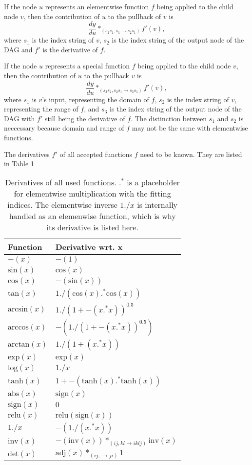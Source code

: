 \documentclass[12pt, a4paper]{report}
\begin{document}
If the node $u$ represents an elementwise function $f$ being applied to the child node $v$, then the contribution of $u$ to the pullback of $v$ is 
$$
\frac{dy}{du} *_{(s_2s_1,s_1 \rightarrow s_2s_1)} f'(v),
$$
where $s_1$ is the index string of $v$, $s_2$ is the index string of the output node of the DAG and $f'$ is the derivative of $f$.

If the node $u$ represents a special function $f$ being applied to the child node $v$, then the contribution of $u$ to the pullback $v$ is
$$
\frac{dy}{du} *_{(s_3s_2,s_2s_1 \rightarrow s_3s_1)} f'(v),
$$
where $s_1$ is $v$'s input, representing the domain of $f$, $s_2$ is the index string of $v$, representing the range of $f$, and $s_3$ is the index string of the output node of the DAG with $f'$ still being the derivative of $f$.
The distinction between $s_1$ and $s_2$ is neccessary because domain and range of $f$ may not be the same with elementwise functions.

The derivatives $f'$ of all accepted functions $f$ need to be known.
They are listed in Table \ref{tab:func_diffs}
\begin{table}[ht]
    \centering
    \begin{tabular}{l | l}
        Function & Derivative wrt. x \\\hline
        $-(x)$ & $-(1)$ \\
        $\text{sin}(x)$ & $\text{cos}(x)$ \\
        $\text{cos}(x)$ & $-(\text{sin}(x))$ \\
        $\text{tan}(x)$ & $1 ./ (\text{cos}(x) .^* \text{cos}(x))$ \\
        $\text{arcsin}(x)$ & $1 ./ (1 + -(x .^* x))^{0.5}$ \\
        $\text{arccos}(x)$ & $-(1 ./ (1 + -(x .^* x))^{0.5})$ \\
        $\text{arctan}(x)$ & $1 ./ (1 + (x .^* x))$ \\
        $\text{exp}(x)$ & $\text{exp}(x)$ \\
        $\text{log}(x)$ & $1 ./ x$ \\
        $\text{tanh}(x)$ & $1 + -(\text{tanh}(x) .^* \text{tanh}(x))$ \\
        $\text{abs}(x)$ & $\text{sign}(x)$ \\
        $\text{sign}(x)$ & $0$ \\
        $\text{relu}(x)$ & $\text{relu}(\text{sign}(x))$ \\
        $1 ./ x$ & $- (1 ./ (x .^* x))$ \\
        $\text{inv}(x)$ & $-(\text{inv}(x)) *_{(ij,kl \rightarrow iklj)} \text{inv}(x)$ \\
        $\text{det}(x)$ & $\text{adj}(x) *_{(ij, \rightarrow ji)} 1$ \\
    \end{tabular}
    \caption{Derivatives of all used functions. $.^*$ is a placeholder for elementwise multiplication with the fitting indices. The elementwise inverse $1 ./ x$ is internally handled as an elemenwise function, which is why its derivative is listed here.} %
    \label{tab:func_diffs}
\end{table}
\FloatBarrier
\end{document}
